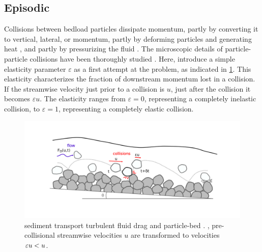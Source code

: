 \subsection{Episodic \DIFdelbegin {}\DIFdelend \DIFaddbegin {}\DIFaddend }
Collisions between bedload particles dissipate momentum, partly by converting it to vertical, lateral, or \DIFdelbegin {}\DIFdelend \DIFaddbegin {}\DIFaddend momentum, partly by deforming particles and \DIFaddbegin {}\DIFaddend generating heat \citep{Schmeeckle2014,Williams2021}, and partly by pressurizing the fluid \DIFaddbegin {}\DIFaddend \citep{Joseph2001,Schmeeckle2001}. 
The microscopic details of particle-particle collisions have been thoroughly studied \citep{Brach1989, Lorenz1997,Montaine2011}\DIFaddbegin {}\DIFaddend . Here, \DIFdelbegin {}\DIFdelend \DIFaddbegin {}\DIFaddend introduce a simple elasticity parameter $\varepsilon$ as a first attempt at the problem, as indicated in \DIFdelbegin {}\DIFdelend \DIFaddbegin {}\DIFaddend \ref{fig:fig1}. This elasticity characterizes the fraction of downstream momentum lost in a collision. If the streamwise velocity just prior to a collision is $u$, just after the collision it becomes $\varepsilon u$. The elasticity ranges from $\varepsilon=0$, representing a completely inelastic collision, to $\varepsilon=1$, representing a completely elastic collision.
\begin{figure}
	\centerline{\includegraphics{./figures/ch5/Fig1Concept.png}}
	\caption{\DIFdelbeginFL {}\DIFdelendFL \DIFaddbeginFL {}\DIFaddendFL sediment transport \DIFdelbeginFL {}\DIFdelendFL \DIFaddbeginFL {}\DIFaddendFL turbulent fluid drag and \DIFaddbeginFL {}\DIFaddendFL particle-bed \DIFdelbeginFL {}\DIFdelendFL \DIFaddbeginFL {}\DIFaddendFL . \DIFdelbeginFL {}\DIFdelendFL \DIFaddbeginFL {}\DIFaddendFL , pre-collisional streamwise velocities $u$ are transformed \DIFaddbeginFL {}\DIFaddendFL to \DIFdelbeginFL {}\DIFdelendFL \DIFaddbeginFL {}\DIFaddendFL velocities $\varepsilon u < u$.}
	\label{fig:fig1}
\end{figure}

